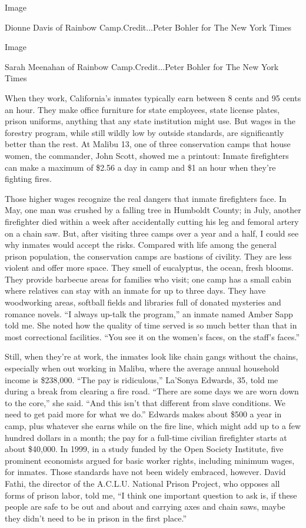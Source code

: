 Image

Dionne Davis of Rainbow Camp.Credit...Peter Bohler for The New York
Times

Image

Sarah Meenahan of Rainbow Camp.Credit...Peter Bohler for The New York
Times

When they work, California's inmates typically earn between 8 cents and
95 cents an hour. They make office furniture for state employees, state
license plates, prison uniforms, anything that any state institution
might use. But wages in the forestry program, while still wildly low by
outside standards, are significantly better than the rest. At Malibu 13,
one of three conservation camps that house women, the commander, John
Scott, showed me a printout: Inmate firefighters can make a maximum of
\$2.56 a day in camp and \$1 an hour when they're fighting fires.

Those higher wages recognize the real dangers that inmate firefighters
face. In May, one man was crushed by a falling tree in Humboldt County;
in July, another firefighter died within a week after accidentally
cutting his leg and femoral artery on a chain saw. But, after visiting
three camps over a year and a half, I could see why inmates would accept
the risks. Compared with life among the general prison population, the
conservation camps are bastions of civility. They are less violent and
offer more space. They smell of eucalyptus, the ocean, fresh blooms.
They provide barbecue areas for families who visit; one camp has a small
cabin where relatives can stay with an inmate for up to three days. They
have woodworking areas, softball fields and libraries full of donated
mysteries and romance novels. ``I always up-talk the program,'' an
inmate named Amber Sapp told me. She noted how the quality of time
served is so much better than that in most correctional facilities.
``You see it on the women's faces, on the staff's faces.''

Still, when they're at work, the inmates look like chain gangs without
the chains, especially when out working in Malibu, where the average
annual household income is \$238,000. ``The pay is ridiculous,''
La'Sonya Edwards, 35, told me during a break from clearing a fire road.
``There are some days we are worn down to the core,'' she said. ``And
this isn't that different from slave conditions. We need to get paid
more for what we do.'' Edwards makes about \$500 a year in camp, plus
whatever she earns while on the fire line, which might add up to a few
hundred dollars in a month; the pay for a full-time civilian firefighter
starts at about \$40,000. In 1999, in a study funded by the Open Society
Institute, five prominent economists argued for basic worker rights,
including minimum wages, for inmates. Those standards have not been
widely embraced, however. David Fathi, the director of the A.C.L.U.
National Prison Project, who opposes all forms of prison labor, told me,
``I think one important question to ask is, if these people are safe to
be out and about and carrying axes and chain saws, maybe they didn't
need to be in prison in the first place.''

